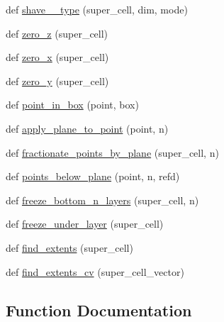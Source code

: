 \begin{DoxyCompactItemize}
\item 
def \hyperlink{namespacemolSimplify_1_1Scripts_1_1cellbuilder__tools_a366d49b288a333d860eb9a8073a7b995}{shave\+\_\+\+\_\+type} (super\+\_\+cell, dim, mode)
\item 
def \hyperlink{namespacemolSimplify_1_1Scripts_1_1cellbuilder__tools_a2307500ffa15b4a8b125dae01b9daaad}{zero\+\_\+z} (super\+\_\+cell)
\item 
def \hyperlink{namespacemolSimplify_1_1Scripts_1_1cellbuilder__tools_abd5feaa3a0cf08a9a80a855251b56331}{zero\+\_\+x} (super\+\_\+cell)
\item 
def \hyperlink{namespacemolSimplify_1_1Scripts_1_1cellbuilder__tools_a79f70031760d72c50938aaa76a705e2f}{zero\+\_\+y} (super\+\_\+cell)
\item 
def \hyperlink{namespacemolSimplify_1_1Scripts_1_1cellbuilder__tools_a64709e9b5524ecf79b355c8a7d2061c3}{point\+\_\+in\+\_\+box} (point, box)
\item 
def \hyperlink{namespacemolSimplify_1_1Scripts_1_1cellbuilder__tools_a2b5818ce478be6724c93ae6ac06275e9}{apply\+\_\+plane\+\_\+to\+\_\+point} (point, n)
\item 
def \hyperlink{namespacemolSimplify_1_1Scripts_1_1cellbuilder__tools_aa402e5461f8810bd43ec6d195395926c}{fractionate\+\_\+points\+\_\+by\+\_\+plane} (super\+\_\+cell, n)
\item 
def \hyperlink{namespacemolSimplify_1_1Scripts_1_1cellbuilder__tools_a7dbb2984cc48a5aade3b7eccf417fed9}{points\+\_\+below\+\_\+plane} (point, n, refd)
\item 
def \hyperlink{namespacemolSimplify_1_1Scripts_1_1cellbuilder__tools_a5a8fb028f0813513c59a6dd20a4d079c}{freeze\+\_\+bottom\+\_\+n\+\_\+layers} (super\+\_\+cell, n)
\item 
def \hyperlink{namespacemolSimplify_1_1Scripts_1_1cellbuilder__tools_a751bf531779ab22dd1c1c1b10ab229fe}{freeze\+\_\+under\+\_\+layer} (super\+\_\+cell)
\item 
def \hyperlink{namespacemolSimplify_1_1Scripts_1_1cellbuilder__tools_aa0a1eea3e38c7c7adc6f2c908a314ff9}{find\+\_\+extents} (super\+\_\+cell)
\item 
def \hyperlink{namespacemolSimplify_1_1Scripts_1_1cellbuilder__tools_a52829c4cfef8850b9d12fd7e8ec8be29}{find\+\_\+extents\+\_\+cv} (super\+\_\+cell\+\_\+vector)
\end{DoxyCompactItemize}


\subsection{Function Documentation}
\mbox{\label{namespacemolSimplify_1_1Scripts_1_1cellbuilder__tools_a2b5818ce478be6724c93ae6ac06275e9}} 
